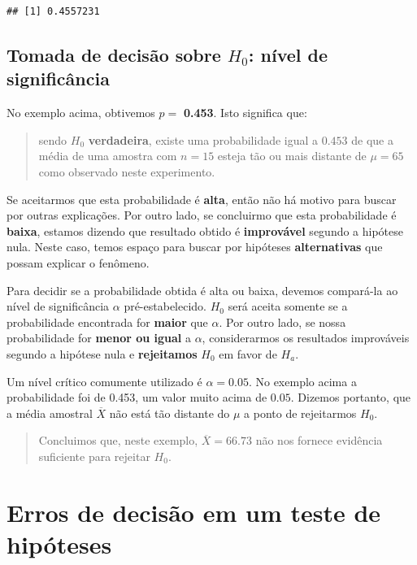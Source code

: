 \documentclass[
]{book}
\begin{document}
\begin{verbatim}
## [1] 0.4557231
\end{verbatim}

\hypertarget{tomada-de-decisuxe3o-sobre-h_0-nuxedvel-de-significuxe2ncia}{%
\subsection{\texorpdfstring{Tomada de decisão sobre \(H_0\): nível de significância}{Tomada de decisão sobre H\_0: nível de significância}}\label{tomada-de-decisuxe3o-sobre-h_0-nuxedvel-de-significuxe2ncia}}

No exemplo acima, obtivemos \(p =\) \textbf{0.453}. Isto significa que:

\begin{quote}
sendo \(H_0\) \textbf{verdadeira}, existe uma probabilidade igual a \(0.453\) de que a média de uma amostra com \(n = 15\) esteja tão ou mais distante de \(\mu = 65\) como observado neste experimento.
\end{quote}

Se aceitarmos que esta probabilidade é \textbf{alta}, então não há motivo para buscar por outras explicações. Por outro lado, se concluirmo que esta probabilidade é \textbf{baixa}, estamos dizendo que resultado obtido é \textbf{improvável} segundo a hipótese nula. Neste caso, temos espaço para buscar por hipóteses \textbf{alternativas} que possam explicar o fenômeno.

Para decidir se a probabilidade obtida é alta ou baixa, devemos compará-la ao nível de significância \(\alpha\) pré-estabelecido. \(H_0\) será aceita somente se a probabilidade encontrada for \textbf{maior} que \(\alpha\). Por outro lado, se nossa probabilidade for \textbf{menor ou igual} a \(\alpha\), considerarmos os resultados improváveis segundo a hipótese nula e \textbf{rejeitamos} \(H_0\) em favor de \(H_a\).

Um nível crítico comumente utilizado é \(\alpha = 0.05\). No exemplo acima a probabilidade foi de 0.453, um valor muito acima de \(0.05\). Dizemos portanto, que a média amostral \(\overline{X}\) não está tão distante do \(\mu\) a ponto de rejeitarmos \(H_0\).

\begin{quote}
Concluimos que, neste exemplo, \(\overline{X} = 66.73\) não nos fornece evidência suficiente para rejeitar \(H_0\).
\end{quote}

\hypertarget{erros-de-decisuxe3o-em-um-teste-de-hipuxf3teses}{%
\section{Erros de decisão em um teste de hipóteses}\label{erros-de-decisuxe3o-em-um-teste-de-hipuxf3teses}}
\end{document}
